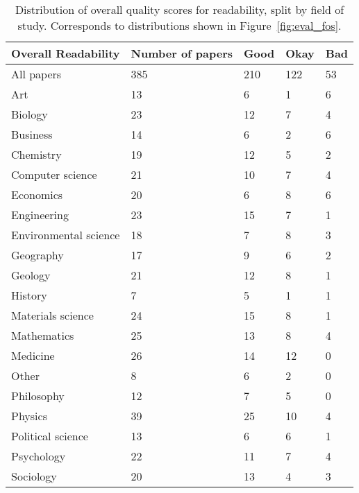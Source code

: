 \begin{table}[h!]
\small
    \centering
    \begin{tabularx}{0.73\linewidth}{L{32mm}L{16mm}L{16mm}L{16mm}X}
    \toprule
        \textbf{Overall Readability} & \textbf{Number of papers} & \textbf{Good} & \textbf{Okay} & \textbf{Bad} \\
    \midrule
        All papers & 385 & 210 & 122 & 53 \\
    \midrule
                  Art  &  13  &   6  &   1  &  6 \\
              Biology  &  23  &  12  &   7  &  4 \\
             Business  &  14  &   6  &   2  &  6 \\
            Chemistry  &  19  &  12  &   5  &  2 \\
     Computer science  &  21  &  10  &   7  &  4 \\
            Economics  &  20  &   6  &   8  &  6 \\
          Engineering  &  23  &  15  &   7  &  1 \\
Environmental science  &  18  &   7  &   8  &  3 \\
            Geography  &  17  &   9  &   6  &  2 \\
              Geology  &  21  &  12  &   8  &  1 \\
              History  &   7  &   5  &   1  &  1 \\
    Materials science  &  24  &  15  &   8  &  1 \\
          Mathematics  &  25  &  13  &   8  &  4 \\
             Medicine  &  26  &  14  &  12  &  0 \\
                Other  &   8  &   6  &   2  &  0 \\
           Philosophy  &  12  &   7  &   5  &  0 \\
              Physics  &  39  &  25  &  10  &  4 \\
    Political science  &  13  &   6  &   6  &  1 \\
           Psychology  &  22  &  11  &   7  &  4 \\
            Sociology  &  20  &  13  &   4  &  3 \\
    \bottomrule
    \end{tabularx}
    \caption{Distribution of overall quality scores for readability, split by field of study. Corresponds to distributions shown in Figure~\ref{fig:eval_fos}.}
    \label{tab:eval_raw_by_fos}
\end{table}

